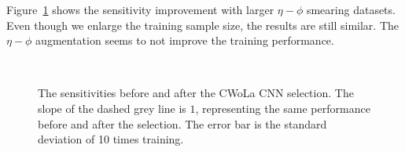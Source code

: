 \documentclass[12pt]{article}
\begin{document}
		Figure~\ref{fig:sensitivity_improvement_origin_eta_phi_aug_1_3} shows the sensitivity improvement with larger $\eta-\phi$ smearing datasets. Even though we enlarge the training sample size, the results are still similar. The $\eta-\phi$ augmentation seems to not improve the training performance.
		\begin{figure}[htpb]
			\centering
			 \\
			\caption{The sensitivities before and after the CWoLa CNN selection. The slope of the dashed grey line is $1$, representing the same performance before and after the selection. The error bar is the standard deviation of 10 times training.}
			\label{fig:sensitivity_improvement_origin_eta_phi_aug_1_3}
		\end{figure}
\end{document}
